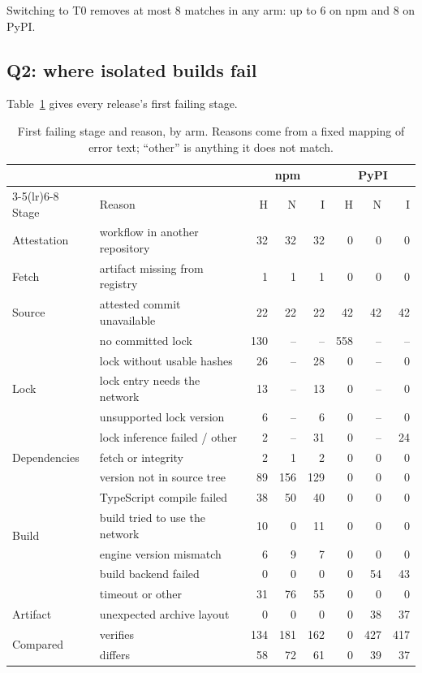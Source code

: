 \documentclass[11pt]{article}
\begin{document}
Switching to T0 removes at most 8 matches in any arm: up to 6 on npm and
8 on PyPI.

\subsection{Q2: where isolated builds fail}

Table~\ref{tab:stages} gives every release's first failing stage.

\begin{table}[htbp]
\centering
\caption{First failing stage and reason, by arm. Reasons come from a
fixed mapping of error text; ``other'' is anything it does not match.}
\label{tab:stages}
\small
\begin{tabular}{llrrrrrr}
\toprule
& & \multicolumn{3}{c}{npm} & \multicolumn{3}{c}{PyPI} \\
\cmidrule(lr){3-5}\cmidrule(lr){6-8}
Stage & Reason & H & N & I & H & N & I \\
\midrule
Attestation & workflow in another repository & 32 & 32 & 32 & 0 & 0 & 0 \\
Fetch & artifact missing from registry & 1 & 1 & 1 & 0 & 0 & 0 \\
Source & attested commit unavailable & 22 & 22 & 22 & 42 & 42 & 42 \\
\midrule
\multirow{5}{*}{Lock}
& no committed lock & 130 & -- & -- & 558 & -- & -- \\
& lock without usable hashes & 26 & -- & 28 & 0 & -- & 0 \\
& lock entry needs the network & 13 & -- & 13 & 0 & -- & 0 \\
& unsupported lock version & 6 & -- & 6 & 0 & -- & 0 \\
& lock inference failed / other & 2 & -- & 31 & 0 & -- & 24 \\
\midrule
Dependencies & fetch or integrity & 2 & 1 & 2 & 0 & 0 & 0 \\
\midrule
\multirow{6}{*}{Build}
& version not in source tree & 89 & 156 & 129 & 0 & 0 & 0 \\
& TypeScript compile failed & 38 & 50 & 40 & 0 & 0 & 0 \\
& build tried to use the network & 10 & 0 & 11 & 0 & 0 & 0 \\
& engine version mismatch & 6 & 9 & 7 & 0 & 0 & 0 \\
& build backend failed & 0 & 0 & 0 & 0 & 54 & 43 \\
& timeout or other & 31 & 76 & 55 & 0 & 0 & 0 \\
\midrule
Artifact & unexpected archive layout & 0 & 0 & 0 & 0 & 38 & 37 \\
\midrule
\multirow{2}{*}{Compared}
& verifies & 134 & 181 & 162 & 0 & 427 & 417 \\
& differs & 58 & 72 & 61 & 0 & 39 & 37 \\
\bottomrule
\end{tabular}
\end{table}
\end{document}
